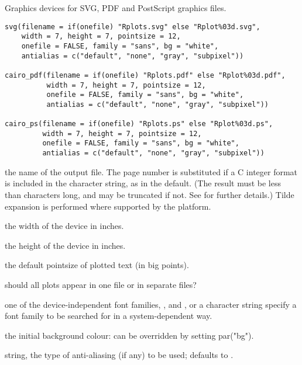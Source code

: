 %
\begin{Description}\relax
Graphics devices for SVG, PDF and PostScript graphics files.
\end{Description}
%
\begin{Usage}
\begin{verbatim}
svg(filename = if(onefile) "Rplots.svg" else "Rplot%03d.svg",
    width = 7, height = 7, pointsize = 12,
    onefile = FALSE, family = "sans", bg = "white",
    antialias = c("default", "none", "gray", "subpixel"))

cairo_pdf(filename = if(onefile) "Rplots.pdf" else "Rplot%03d.pdf",
          width = 7, height = 7, pointsize = 12,
          onefile = FALSE, family = "sans", bg = "white",
          antialias = c("default", "none", "gray", "subpixel"))

cairo_ps(filename = if(onefile) "Rplots.ps" else "Rplot%03d.ps",
         width = 7, height = 7, pointsize = 12,
         onefile = FALSE, family = "sans", bg = "white",
         antialias = c("default", "none", "gray", "subpixel"))
\end{verbatim}
\end{Usage}
%
\begin{Arguments}
\begin{ldescription}
\item[\code{filename}] the name of the output file.
The page number is substituted if a C integer format is included in
the character string, as in the default.  (The result must be less
than  characters long, and may be truncated if not.
See  for further details.)  Tilde expansion
is performed where supported by the platform.
\item[\code{width}] the width of the device in inches.
\item[\code{height}] the height of the device in inches.
\item[\code{pointsize}] the default pointsize of plotted text (in big points).
\item[\code{onefile}] should all plots appear in one file or in separate files?
\item[\code{family}] one of the device-independent font families,
,  and , or a character
string specify a font family to be searched for in a
system-dependent way.

\item[\code{bg}] the initial background colour: can be overridden by setting
par("bg").
\item[\code{antialias}] string, the type of anti-aliasing (if any) to be used;
defaults to .
\end{ldescription}
\end{Arguments}
